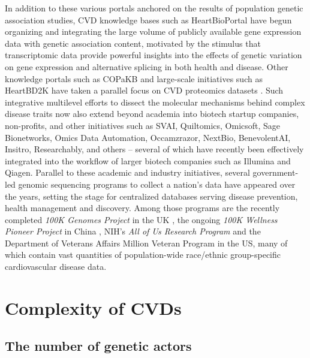 \documentclass[letter]{bib}
\begin{document}
	In addition to these various portals anchored on the results of population genetic association studies, CVD knowledge bases such as HeartBioPortal \citep{Khomtchouk:2019:HeartBioPortal} have begun organizing and integrating the large volume of publicly available gene expression data with genetic association content, motivated by the stimulus that transcriptomic data provide powerful insights into the effects of genetic variation on gene expression and alternative splicing in both health and disease.  Other knowledge portals such as COPaKB \citep{Zong:2013:Integration} and large-scale initiatives such as HeartBD2K \citep{HeartBD2K} have taken a parallel focus on CVD proteomics datasets \citep{Lau:2016:large}.  Such integrative multilevel efforts to dissect the molecular mechanisms behind complex disease traits now also extend beyond academia into biotech startup companies, non-profits, and other initiatives such as SVAI, Quiltomics, Omicsoft, Sage Bionetworks, Omics Data Automation, Occamzrazor, NextBio, BenevolentAI, Insitro, Researchably, and others -- several of which have recently been effectively integrated into the workflow of larger biotech companies such as Illumina and Qiagen.  Parallel to these academic and industry initiatives, several government-led genomic sequencing programs to collect a nation's data have appeared over the years, setting the stage for centralized databases serving disease prevention, health management and discovery. Among those programs are the recently completed \textit{100K Genomes Project} in the UK \citep{Caulfield:2017:100K}, the ongoing \textit{100K Wellness Pioneer Project} in China \citep{Kalia:2017:China}, NIH's \textit{All of Us Research Program} \citep{NIH:2018:All} and the Department of Veterans Affairs Million Veteran Program \citep{Gaziano:2016:Million} in the US, many of which contain vast quantities of population-wide race/ethnic group-specific cardiovascular disease data.  



	
	\section*{Complexity of CVDs}  %
	\subsection*{The number of genetic actors}
	
\end{document}
